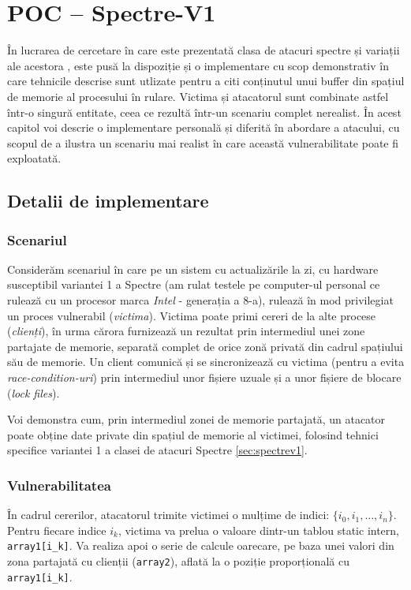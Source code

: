 \chapter{POC -- Spectre-V1}
\label{cap:poc}

În lucrarea de cercetare în care este prezentată clasa de atacuri spectre și
variații ale acestora \cite{spectre2019}, este pusă la dispoziție și o 
implementare cu scop demonstrativ în care tehnicile descrise sunt utlizate
pentru a citi conținutul unui buffer din spațiul de memorie al procesului
în rulare. Victima și atacatorul sunt combinate astfel într-o singură entitate,
ceea ce rezultă într-un scenariu complet nerealist. În acest capitol voi descrie
o implementare personală și diferită în abordare a atacului, cu scopul de a ilustra
un scenariu mai realist în care această vulnerabilitate poate fi exploatată.

\section{Detalii de implementare}

\subsection{Scenariul}

Considerăm scenariul în care pe un sistem cu actualizările la zi, cu hardware
susceptibil variantei 1 a Spectre (am rulat testele pe computer-ul personal ce
rulează cu un procesor marca \emph{Intel} - generația a 8-a), rulează în mod
privilegiat un proces vulnerabil (\emph{victima}). Victima poate primi cereri
de la alte procese (\emph{clienți}), în urma cărora furnizează un rezultat prin
intermediul unei zone partajate de memorie, separată complet de orice zonă
privată din cadrul spațiului său de memorie. Un client comunică și se sincronizează
cu victima (pentru a evita \emph{race-condition-uri}) prin intermediul unor fișiere
uzuale și a unor fișiere de blocare (\emph{lock files}).

Voi demonstra cum, prin intermediul zonei de memorie partajată, un atacator poate 
obține date private din spațiul de memorie al victimei, folosind tehnici specifice
variantei 1 a clasei de atacuri Spectre \ref{sec:spectrev1}.

\subsection{Vulnerabilitatea}

În cadrul cererilor, atacatorul trimite victimei o mulțime de indici: $\{i_0,
i_1, \dots, i_n\}$. Pentru fiecare indice $i_k$, victima va prelua o valoare dintr-un
tablou static intern, \texttt{array1[i\_k]}. Va realiza apoi o serie de calcule
oarecare, pe baza unei valori din zona partajată cu clienții (\texttt{array2}),
aflată la o poziție proporțională cu \texttt{array1[i\_k]}.

